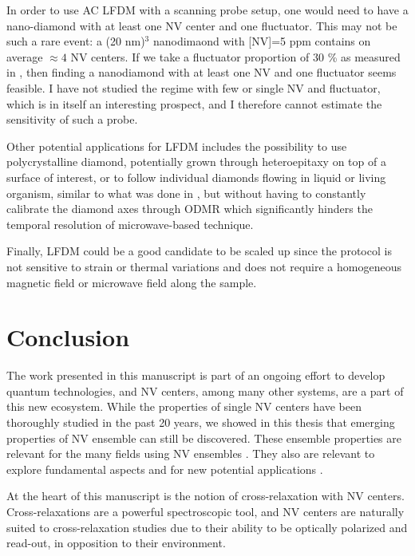 \documentclass[a4paper, 11pt]{book}
\begin{document}
In order to use AC LFDM with a scanning probe setup, one would need to have a nano-diamond with at least one NV center and one fluctuator. This may not be such a rare event: a (20 nm)$^{3}$ nanodimaond with [NV]=5 ppm contains on average $\approx 4$ NV centers. If we take a fluctuator proportion of 30 \% as measured in \citep{choi2017depolarization}, then finding a nanodiamond with at least one NV and one fluctuator  seems feasible. I have not studied the regime with few or single NV and fluctuator, which is in itself an interesting prospect, and I therefore cannot estimate the sensitivity of such a probe. 

Other potential applications for LFDM includes the possibility to use polycrystalline diamond, potentially grown through heteroepitaxy on top of a surface of interest, or to follow individual diamonds flowing in liquid or living organism, similar to what was done in \citep{feng2021association}, but without having to constantly calibrate the diamond axes through ODMR which significantly hinders the temporal resolution of microwave-based technique.

Finally, LFDM could be a good candidate to be scaled up since the protocol is not sensitive to strain or thermal variations and does not require a homogeneous magnetic field or microwave field along the sample.



\chapter*{Conclusion}

The work presented in this manuscript is part of an ongoing effort to develop quantum technologies, and NV centers, among many other systems, are a part of this new ecosystem. While the properties of single NV centers have been thoroughly studied in the past 20 years, we showed in this thesis that emerging properties of NV ensemble can still be discovered. These ensemble properties are relevant for the many fields using NV ensembles \citep{ barry2020sensitivity, eills2022spin, fu2007characterization, perdriat2021spin}. They also are relevant to explore fundamental aspects \citep{choi2017observation, kucsko2018critical, angerer2018superradiant} and for new potential applications \citep{akhmedzhanov2017microwave, pellet2021optical, pellet2022spin}.

At the heart of this manuscript is the notion of cross-relaxation with NV centers. Cross-relaxations are a powerful spectroscopic tool, and NV centers are naturally suited to cross-relaxation studies due to their ability to be optically polarized and read-out, in opposition to their environment.
\end{document}
